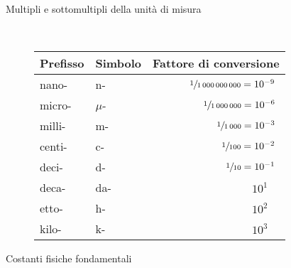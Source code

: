 \documentclass[a4paper,11pt,italian]{article}
\begin{document}
\begin{description}
  \item[Multipli e sottomultipli della unità di misura] ~%
  \begin{table}[h]\centering
    \begin{tabular}{llr}\toprule
      \textbf{Prefisso} & \textbf{Simbolo} & \textbf{Fattore di conversione} \\\midrule
      nano- & n- & $ \sfrac{1}{1\,000\,000\,000} = 10^{-9} \:\, $\\\addlinespace[.2em]
      micro- & $ \mu $- & $ \sfrac{1}{1\,000\,000} = 10^{-6} \:\, $\\\addlinespace[.2em]
      milli- & m- & $ \sfrac{1}{1\,000} = 10^{-3} \:\, $\\\addlinespace[.2em]
      centi- & c- & $ \sfrac{1}{100} = 10^{-2} \:\, $\\\addlinespace[.2em]
      deci- & d- & $ \sfrac{1}{10} = 10^{-1} \:\, $\\\addlinespace[.2em]
      deca- & da- & $ 10^{1} \;\;\;\, $\\\addlinespace[.2em]
      etto- & h- & $ 10^{2} \;\;\;\, $\\\addlinespace[.2em]
      kilo- & k- & $ 10^{3} \;\;\;\, $\\\bottomrule
    \end{tabular}
  \end{table}
  

  
  \item[Costanti fisiche fondamentali] ~%
  

\end{description}
\end{document}
